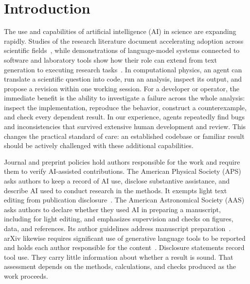 \documentclass[aps,prd,reprint,nofootinbib]{revtex4-2}
\begin{document}
\section{Introduction}\label{sec:introduction}
The use and capabilities of artificial intelligence (AI) in science are expanding rapidly. Studies of the research literature document accelerating adoption across scientific fields~\cite{Hao2026}, while demonstrations of language-model systems connected to software and laboratory tools show how their role can extend from text generation to executing research tasks~\cite{Boiko2023}. In computational physics, an agent can translate a scientific question into code, run an analysis, inspect its output, and propose a revision within one working session. For a developer or operator, the immediate benefit is the ability to investigate a failure across the whole analysis: inspect the implementation, reproduce the behavior, construct a counterexample, and check every dependent result. In our experience, agents repeatedly find bugs and inconsistencies that survived extensive human development and review. This changes the practical standard of care: an established codebase or familiar result should be actively challenged with these additional capabilities.

Journal and preprint policies hold authors responsible for the work and require them to verify AI-assisted contributions. The American Physical Society (APS) asks authors to keep a record of AI use, disclose substantive assistance, and describe AI used to conduct research in the methods. It exempts light text editing from publication disclosure~\cite{APS2026}. The American Astronomical Society (AAS) asks authors to declare whether they used AI in preparing a manuscript, including for light editing, and emphasizes supervision and checks on figures, data, and references. Its author guidelines address manuscript preparation~\cite{AAS2026}. arXiv likewise requires significant use of generative language tools to be reported and holds each author responsible for the content~\cite{arXivAI}. Disclosure statements record tool use. They carry little information about whether a result is sound. That assessment depends on the methods, calculations, and checks produced as the work proceeds.
\end{document}
